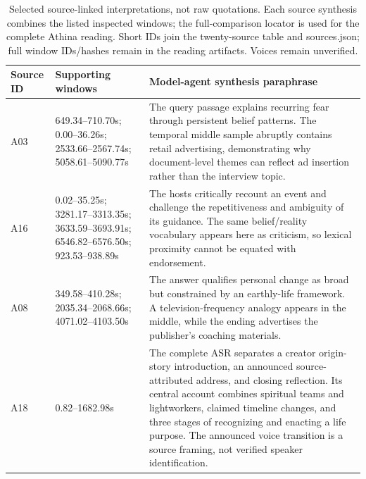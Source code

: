 \begin{table}[t]
\centering\small
\begin{tabular}{lp{}p{}}
\toprule
Source ID & Supporting windows & Model-agent synthesis paraphrase\\
\midrule
A03 & 649.34--710.70s; 0.00--36.26s; 2533.66--2567.74s; 5058.61--5090.77s & The query passage explains recurring fear through persistent belief patterns. The temporal middle sample abruptly contains retail advertising, demonstrating why document-level themes can reflect ad insertion rather than the interview topic.\\
A16 & 0.02--35.25s; 3281.17--3313.35s; 3633.59--3693.91s; 6546.82--6576.50s; 923.53--938.89s & The hosts critically recount an event and challenge the repetitiveness and ambiguity of its guidance. The same belief/reality vocabulary appears here as criticism, so lexical proximity cannot be equated with endorsement.\\
A08 & 349.58--410.28s; 2035.34--2068.66s; 4071.02--4103.50s & The answer qualifies personal change as broad but constrained by an earthly-life framework. A television-frequency analogy appears in the middle, while the ending advertises the publisher's coaching materials.\\
A18 & 0.82--1682.98s & The complete ASR separates a creator origin-story introduction, an announced source-attributed address, and closing reflection. Its central account combines spiritual teams and lightworkers, claimed timeline changes, and three stages of recognizing and enacting a life purpose. The announced voice transition is a source framing, not verified speaker identification.\\
\bottomrule
\end{tabular}
\caption{Selected source-linked interpretations, not raw quotations. Each source synthesis combines the listed inspected windows; the full-comparison locator is used for the complete Athina reading. Short IDs join the twenty-source table and sources.json; full window IDs/hashes remain in the reading artifacts. Voices remain unverified.}
\end{table}
